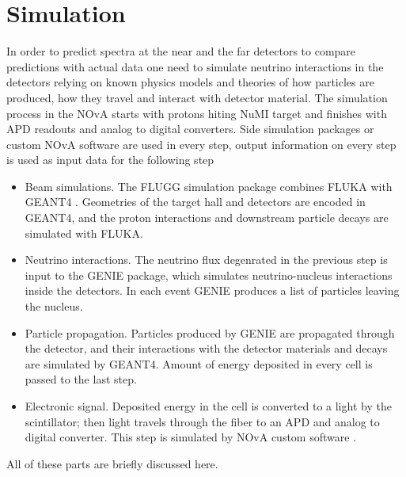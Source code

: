 \chapter{Simulation}
\label{simulation_chapter}

In order to predict spectra at the near and the far detectors to compare predictions with
actual data one need to simulate neutrino interactions in the detectors relying on
known physics models and theories of how particles are produced, how they travel and interact
with detector material. The simulation process in the NOvA starts with protons hiting
NuMI target and finishes with APD readouts and analog to digital converters. Side simulation
packages or custom NOvA software are used in every step, output information on every step is
used as input data for the following step
\begin{itemize}
\item Beam simulations. The FLUGG simulation package combines FLUKA \cite{FLUKA} with GEANT4 \cite{GEANT4}.
Geometries of the target hall and detectors are encoded in GEANT4, and the proton interactions
and downstream particle decays are simulated with FLUKA.
\item Neutrino interactions. The neutrino flux degenrated in the previous step is input to
the GENIE \cite{GENIE} package, which simulates neutrino-nucleus interactions inside the
detectors. In each event GENIE produces a list of particles leaving the nucleus.
\item Particle propagation. Particles produced by GENIE are propagated through the detector,
and their interactions with the detector materials and decays are simulated by GEANT4. Amount of
energy deposited in every cell is passed to the last step.
\item Electronic signal. Deposited energy in the cell is converted to a light by the scintillator;
then light travels through the fiber to an APD and analog to digital converter. This step is
simulated by NOvA custom software \cite{NovaSim}.
\end{itemize}
All of these parts are briefly discussed here.

